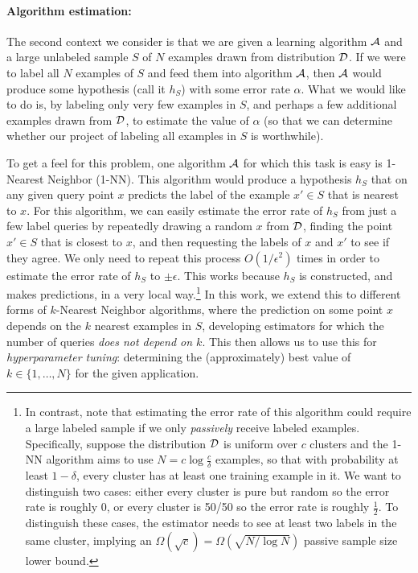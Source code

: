 \paragraph{Algorithm estimation:}
The second context we consider is that we are given a learning algorithm ${\mathcal{A}}$ and a large unlabeled sample $S$ of $N$ examples drawn from distribution ${\mathcal{D}}$.  If we were to label all $N$ examples of $S$ and feed them into algorithm ${\mathcal{A}}$, then ${\mathcal{A}}$ would produce some hypothesis (call it $h_S$) with some error rate $\alpha$.   What we would like to do is, by labeling only very few examples in $S$, and perhaps a few additional examples drawn from ${\mathcal{D}}$, to estimate the value of $\alpha$ (so that we can determine whether our project of labeling all examples in $S$ is worthwhile).   

To get a feel for this problem, one algorithm ${\mathcal{A}}$ for which this task is easy is 1-Nearest Neighbor (1-NN).  This algorithm would produce a hypothesis $h_S$ that on any given query point $x$ predicts the label of the example $x' \in S$ that is nearest to $x$.  For this algorithm, we can easily estimate the error rate of $h_S$ from just a few label queries by repeatedly drawing a random $x$ from ${\mathcal{D}}$, finding the point $x' \in S$ that is closest to $x$, and then requesting the labels of $x$ and $x'$ to see if they agree.   We only need to repeat this process $O(1/\epsilon^2)$ times in order to estimate the error rate of $h_S$ to $\pm \epsilon$.  This works because $h_S$ is constructed, and makes predictions, in a very local way.\footnote{In contrast, note that estimating the error rate of this algorithm could require a large labeled sample if we only \emph{passively} receive labeled examples.  Specifically, suppose the distribution ${\mathcal{D}}$ is uniform over $c$ clusters and the 1-NN algorithm aims to use $N = c\log\frac{c}{\delta}$ examples, so that with probability at least $1-\delta$, every cluster has at least one training example in it.  We want to distinguish two cases: either every cluster is pure but random so the error rate is roughly 0, or every cluster is 50/50 so the error rate is roughly $\frac{1}{2}$. To distinguish these cases, the estimator needs to see at least two labels in the same cluster, implying an $\Omega(\sqrt c)=\Omega(\sqrt {N/\log N})$ passive sample size lower bound.}  In this work, we extend this to different forms of $k$-Nearest Neighbor algorithms, where the prediction on some point $x$ depends on the $k$ nearest examples in $S$, developing estimators for which the number of queries {\em does not depend on $k$}.    This then allows us to use this for {\em hyperparameter tuning}: determining the (approximately) best value of $k \in \{1, \ldots, N\}$ for the given application.

\label{sec:intro}
